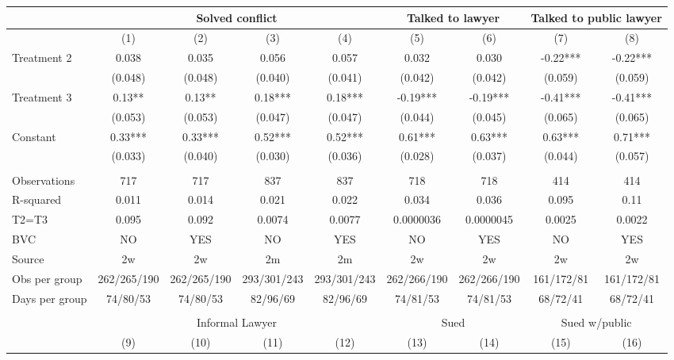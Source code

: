 \begin{tabular}{lcccccccc}
\toprule
      & \multicolumn{4}{c}{Solved conflict} & \multicolumn{2}{c}{Talked to lawyer} & \multicolumn{2}{c}{Talked to public lawyer} \\
\midrule
\midrule
      & (1)   & (2)   & (3)   & (4)   & (5)   & (6)   & (7)   & (8) \\
\midrule
\midrule
Treatment 2 & 0.038 & 0.035 & 0.056 & 0.057 & 0.032 & 0.030 & -0.22*** & -0.22*** \\
      & (0.048) & (0.048) & (0.040) & (0.041) & (0.042) & (0.042) & (0.059) & (0.059) \\
Treatment 3 & 0.13** & 0.13** & 0.18*** & 0.18*** & -0.19*** & -0.19*** & -0.41*** & -0.41*** \\
      & (0.053) & (0.053) & (0.047) & (0.047) & (0.044) & (0.045) & (0.065) & (0.065) \\
Constant  & 0.33*** & 0.33*** & 0.52*** & 0.52*** & 0.61*** & 0.63*** & 0.63*** & 0.71*** \\
      & (0.033) & (0.040) & (0.030) & (0.036) & (0.028) & (0.037) & (0.044) & (0.057) \\
      &       &       &       &       &       &       &       &  \\
\midrule
Observations & 717   & 717   & 837   & 837   & 718   & 718   & 414   & 414 \\
R-squared & 0.011 & 0.014 & 0.021 & 0.022 & 0.034 & 0.036 & 0.095 & 0.11 \\
T2=T3 & 0.095 & 0.092 & 0.0074 & 0.0077 & 0.0000036 & 0.0000045 & 0.0025 & 0.0022 \\
BVC   & NO    & YES   & NO    & YES   & NO    & YES   & NO    & YES \\
Source & 2w    & 2w    & 2m    & 2m    & 2w    & 2w    & 2w    & 2w \\
Obs per group & 262/265/190 & 262/265/190 & 293/301/243 & 293/301/243 & 262/266/190 & 262/266/190 & 161/172/81 & 161/172/81 \\
Days per group & 74/80/53 & 74/80/53 & 82/96/69 & 82/96/69 & 74/81/53 & 74/81/53 & 68/72/41 & 68/72/41 \\
\midrule
\midrule
      &       &       &       &       &       &       &       &  \\
\midrule
      & \multicolumn{4}{c}{Informal Lawyer} & \multicolumn{2}{c}{Sued} & \multicolumn{2}{c}{Sued w/public} \\
\midrule
\midrule
      & (9)   & (10)  & (11)  & (12)  & (13)  & (14)  & (15)  & (16) \\

\end{tabular}
